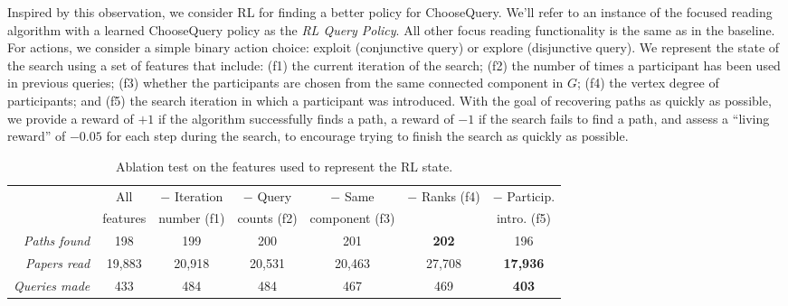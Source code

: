 Inspired by this observation, we consider RL for finding a better policy for {\sc ChooseQuery}.  We'll refer to an instance of the focused reading algorithm with a learned {\sc ChooseQuery} policy as the {\em RL Query Policy}.  All other focus reading functionality is the same as in the baseline.  
For actions, we consider a simple binary action choice: exploit (conjunctive query) or explore (disjunctive query).
We represent the state of the search using a set of features that include: 
(f1) the current iteration of the search; 
(f2) the number of times a participant has been used in previous queries;
(f3) whether the participants are chosen from the same connected component in $G$;
(f4) the vertex degree of participants; 
and (f5) the search iteration in which a participant was introduced.
With the goal of recovering paths as quickly as possible, we provide a reward of $+1$ if the algorithm successfully finds a path, a reward of $-1$ if the search fails to find a path, and assess a ``living reward'' of $-0.05$ for each step during the search, to encourage trying to finish the search as quickly as possible.

\begin{table*}[t!]
\begin{footnotesize}
\begin{center}
  \begin{tabular}{r|cccccc}
    & All & $-$ Iteration & $-$ Query& $-$ Same & $-$ Ranks (f4)& $-$ Particip.\\
    & features & number (f1) & counts (f2)& component (f3)& & intro. (f5)\\
    \hline
    \emph{Paths found}& 198&199 & 200 & 201 & \textbf{202} & 196\\
    \emph{Papers read}& 19,883&20,918 & 20,531 & 20,463 & 27,708 & \textbf{17,936}\\
    \emph{Queries made}& 433&484&484 & 467 & 469 & \textbf{403}
  \end{tabular}
  \end{center}
  \end{footnotesize}
  \vspace{-2mm}
  \caption{Ablation test on the features used to represent the RL state.}
  \vspace{-4mm}
  \label{table:ablation}
\end{table*}


